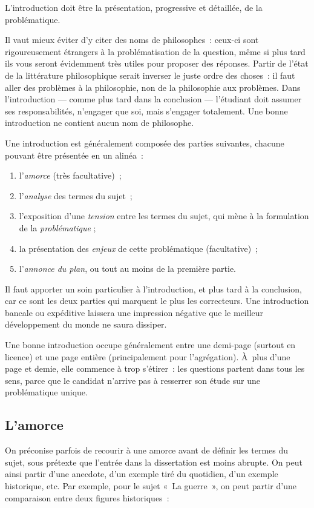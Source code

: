 \documentclass[a4paper]{article}
\begin{document}
L'introduction doit être la présentation, progressive et détaillée, de
la problématique.

Il vaut mieux éviter d'y citer des noms de philosophes : ceux-ci sont
rigoureusement étrangers à la problématisation de la question, même si
plus tard ils vous seront évidemment très utiles pour proposer des
réponses. Partir de l'état de la littérature philosophique serait
inverser le juste ordre des choses : il faut aller des problèmes à la
philosophie, non de la philosophie aux problèmes. Dans l'introduction
--- comme plus tard dans la conclusion --- l'étudiant doit assumer ses
responsabilités, n'engager que soi, mais s'engager totalement. Une bonne
introduction ne contient aucun nom de philosophe.

Une introduction est généralement composée des parties suivantes,
chacune pouvant être présentée en un alinéa :

\begin{enumerate}
\item l'\emph{amorce} (très facultative) ;
\item l'\emph{analyse} des termes du sujet ;
\item l'exposition d'une \emph{tension} entre les termes du sujet, qui mène à la
   formulation de la \emph{problématique} ;
\item la présentation des \emph{enjeux} de cette problématique (facultative) ;
\item l'\emph{annonce du plan}, ou tout au moins de la première partie.
\end{enumerate}

Il faut apporter un soin particulier à l'introduction, et plus tard à la
conclusion, car ce sont les deux parties qui marquent le plus les
correcteurs. Une introduction bancale ou expéditive laissera une
impression négative que le meilleur développement du monde ne saura
dissiper.

Une bonne introduction occupe généralement entre une demi-page (surtout
en licence) et une page entière (principalement pour l'agrégation).
À plus d'une page et demie, elle commence à trop s'étirer : les
questions partent dans tous les sens, parce que le candidat n'arrive pas
à resserrer son étude sur une problématique unique.
\subsection{L'amorce}
\label{sec-2-1}


On préconise parfois de recourir à une amorce avant de définir les
termes du sujet, sous prétexte que l'entrée dans la dissertation est
moins abrupte. On peut ainsi partir d'une anecdote, d'un exemple tiré du
quotidien, d'un exemple historique, etc. Par exemple, pour le sujet « La
guerre », on peut partir d'une comparaison entre deux figures
historiques :
\end{document}

